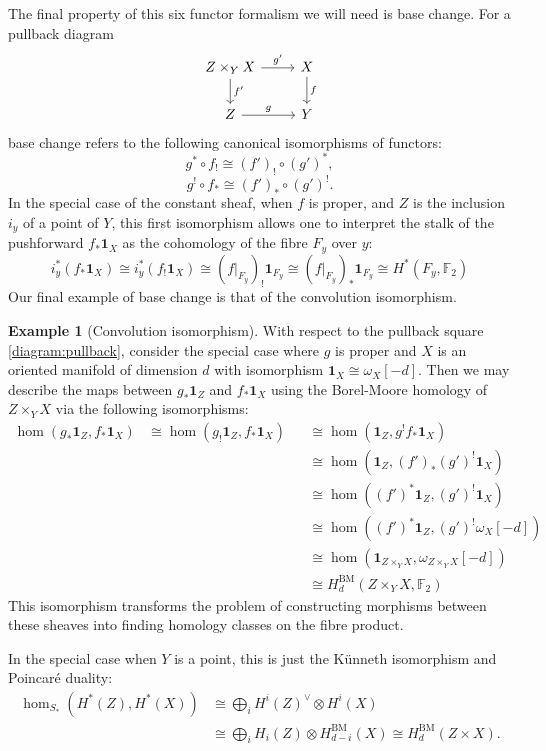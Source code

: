 \documentclass{amsart}
\theoremstyle{definition}
\newtheorem{ex}[thm]{Example}
\theoremstyle{remark}
\begin{document}
The final property of this six functor formalism we will need is base change. For a pullback diagram \begin{equation}\label{diagram:pullback}
    \begin{tikzcd}
    Z\times_Y X\arrow[r,"g'"]\arrow[d,"f'"]&X\arrow[d,"f"]\\
    Z\arrow[r,"g"]&Y
\end{tikzcd}
\end{equation}
base change refers to the following canonical isomorphisms of functors:
\[ g^*\circ f_!\cong (f')_!\circ (g')^*,\]
\[g^!\circ f_*\cong (f')_*\circ (g')^!.\]
In the special case of the constant sheaf, when $f$ is proper, and $Z$ is the inclusion $i_y$ of a point of $Y$, this first isomorphism allows one to interpret the stalk of the pushforward $f_*\mathbf{1}_X$ as the cohomology of the fibre $F_y$ over $y$:
\[i_y^*(f_*\mathbf{1}_X)\cong i_y^*(f_!\mathbf{1}_X)\cong (f|_{F_y})_!\mathbf{1}_{F_y}\cong (f|_{F_y})_*\mathbf{1}_{F_y}\cong H^*(F_y,\mathbb{F}_2)\]
Our final example of base change is that of the convolution isomorphism.
\begin{ex}[Convolution isomorphism]\label{Ex:conv iso}
With respect to the pullback square \ref{diagram:pullback}, consider the special case where $g$ is proper and $X$ is an oriented manifold of dimension $d$ with isomorphism $\mathbf{1}_X\cong \omega_X[-d]$. Then we may describe the maps between $g_*\mathbf{1}_Z$ and $f_*\mathbf{1}_X$ using the Borel-Moore homology of $Z\times_Y X$ via the following isomorphisms:
\begin{align*}
\hom(g_*\mathbf{1}_Z,f_*\mathbf{1}_X)&\cong\hom(g_!\mathbf{1}_Z,f_*\mathbf{1}_X)&&\!\!\!\!\!\!\!\!\!\!\!\!\!\!\!\!\!\!\!\cong \hom(\mathbf{1}_Z,g^!f_*\mathbf{1}_X)\\
&&&\!\!\!\!\!\!\!\!\!\!\!\!\!\!\!\!\!\!\!\cong \hom(\mathbf{1}_Z,(f')_*(g')^!\mathbf{1}_X)\\
&&&\!\!\!\!\!\!\!\!\!\!\!\!\!\!\!\!\!\!\!\cong\hom((f')^*\mathbf{1}_Z,(g')^!\mathbf{1}_X)\\
&&&\!\!\!\!\!\!\!\!\!\!\!\!\!\!\!\!\!\!\!\cong \hom((f')^*\mathbf{1}_Z,(g')^!\omega_X[-d])\\
&&&\!\!\!\!\!\!\!\!\!\!\!\!\!\!\!\!\!\!\!\cong \hom(\mathbf{1}_{Z\times_Y X},\omega_{Z\times_Y X}[-d])\\
&&&\!\!\!\!\!\!\!\!\!\!\!\!\!\!\!\!\!\!\!\cong H_d^{\mathrm{BM}}(Z\times_Y X,\mathbb{F}_2)
\end{align*}
This isomorphism transforms the problem of constructing morphisms between these sheaves into finding homology classes on the fibre product.

In the special case when $Y$ is a point, this is just the Künneth isomorphism and Poincaré duality: \begin{align*}
    \hom_{S_\ast}(H^*(Z),H^*(X))&\cong \bigoplus_i H^i(Z)^\vee \otimes H^i(X)\\
    &\cong\bigoplus_i H_i(Z)\otimes H^{\mathrm{BM}}_{d-i}(X)\cong H^{\mathrm{BM}}_d(Z\times X).
\end{align*}
\end{ex}
\end{document}
